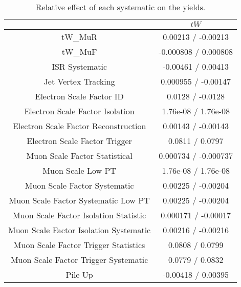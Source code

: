\documentclass[10pt]{article}
\begin{document}
\begin{table}[htbp]
\begin{center}
\begin{tabular}{|c|c|}
\hline 
      & $tW$ \\ 
\hline 
  tW_MuR & 0.00213 / -0.00213 \\ 
  tW_MuF & -0.000808 / 0.000808 \\ 
  ISR Systematic & -0.00461 / 0.00413 \\ 
  Jet Vertex Tracking & 0.000955 / -0.00147 \\ 
  Electron Scale Factor ID & 0.0128 / -0.0128 \\ 
  Electron Scale Factor Isolation & 1.76e-08 / 1.76e-08 \\ 
  Electron Scale Factor Reconstruction & 0.00143 / -0.00143 \\ 
  Electron Scale Factor Trigger & 0.0811 / 0.0797 \\ 
  Muon Scale Factor Statistical & 0.000734 / -0.000737 \\ 
  Muon Scale Low PT & 1.76e-08 / 1.76e-08 \\ 
  Muon Scale Factor Systematic & 0.00225 / -0.00204 \\ 
  Muon Scale Factor Systematic Low PT & 0.00225 / -0.00204 \\ 
  Muon Scale Factor Isolation Statistic & 0.000171 / -0.00017 \\ 
  Muon Scale Factor Isolation Systematic & 0.00216 / -0.00216 \\ 
  Muon Scale Factor Trigger Statistics & 0.0808 / 0.0799 \\ 
  Muon Scale Factor Trigger Systematic & 0.0779 / 0.0832 \\ 
  Pile Up & -0.00418 / 0.00395 \\ 
\hline 
\end{tabular} 
\caption{Relative effect of each systematic on the yields.} 
\end{center} 
\end{table} 
\end{document}
